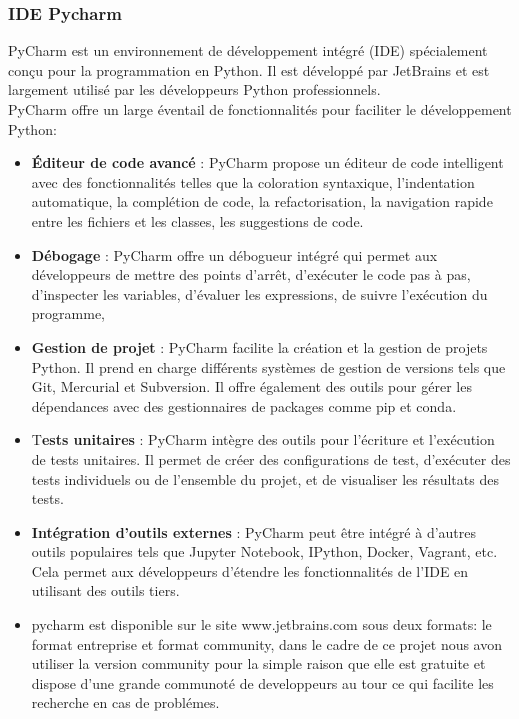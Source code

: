 \documentclass{article}
\begin{document}
\subsubsection  { IDE Pycharm}
PyCharm est un environnement de développement intégré (IDE) spécialement conçu pour la programmation en Python. Il est développé par JetBrains et est largement utilisé par les développeurs Python professionnels.\\

PyCharm offre un large éventail de fonctionnalités pour faciliter le développement Python: \\
\begin{itemize}
     \item \textbf{Éditeur de code avancé }: PyCharm propose un éditeur de code intelligent avec des fonctionnalités telles que la coloration syntaxique, l'indentation automatique, la complétion de code, la refactorisation, la navigation rapide entre les fichiers et les classes, les suggestions de code.\\
     \item \textbf{Débogage }: PyCharm offre un débogueur intégré qui permet aux développeurs de mettre des points d'arrêt, d'exécuter le code pas à pas, d'inspecter les variables, d'évaluer les expressions, de suivre l'exécution du programme,\\
      \item \textbf{Gestion de projet }: PyCharm facilite la création et la gestion de projets Python. Il prend en charge différents systèmes de gestion de versions tels que Git, Mercurial et Subversion. Il offre également des outils pour gérer les dépendances avec des gestionnaires de packages comme pip et conda.\\

     \item T\textbf{ests unitaires }: PyCharm intègre des outils pour l'écriture et l'exécution de tests unitaires. Il permet de créer des configurations de test, d'exécuter des tests individuels ou de l'ensemble du projet, et de visualiser les résultats des tests.\\
    \item \textbf{Intégration d'outils externes }: PyCharm peut être intégré à d'autres outils populaires tels que Jupyter Notebook, IPython, Docker, Vagrant, etc. Cela permet aux développeurs d'étendre les fonctionnalités de l'IDE en utilisant des outils tiers.\\
    \item pycharm est disponible sur le site {www.jetbrains.com} sous deux formats: le format entreprise et format community, dans le cadre de ce projet nous avon utiliser la version community pour la simple raison que elle est gratuite et dispose d'une grande communoté de developpeurs au tour ce qui facilite les recherche en cas de problémes.
\end{itemize}    
\end{document}
